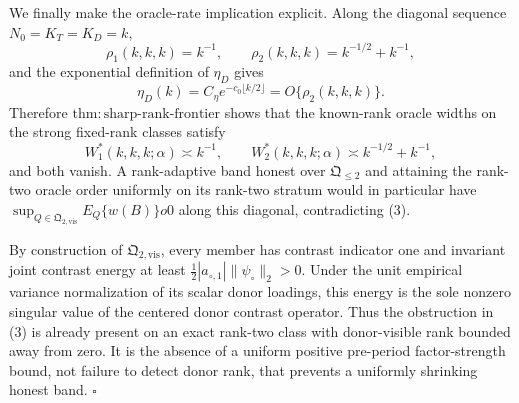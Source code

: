 We finally make the oracle-rate implication explicit.  Along the diagonal
sequence \(N_0=K_T=K_D=k\),
\[
 \rho_1(k,k,k)=k^{-1},
 \qquad
 \rho_2(k,k,k)=k^{-1/2}+k^{-1},                            \tag{7}
\]
and the exponential definition of \(\eta_D\) gives
\[
 \eta_D(k)=C_\eta e^{-c_0\lfloor k/2\rfloor}
 =O\{\rho_2(k,k,k)\}.                                     \tag{8}
\]
Therefore \(\mathrm{thm:sharp\mbox{-}rank\mbox{-}frontier}\) shows that
the known-rank oracle widths on the strong fixed-rank classes satisfy
\[
 W_1^*(k,k,k;\alpha)\asymp k^{-1},
 \qquad
 W_2^*(k,k,k;\alpha)\asymp k^{-1/2}+k^{-1},               \tag{9}
\]
and both vanish.  A rank-adaptive band honest over
\(\mathfrak Q_{\leq2}\) and attaining the rank-two oracle order uniformly
on its rank-two stratum would in particular have
\(\sup_{Q\in\mathfrak Q_{2,\mathrm{vis}}}E_Q\{w(B)\}  o0\)
along this diagonal, contradicting (3).

By construction of \(\mathfrak Q_{2,\mathrm{vis}}\), every member has
contrast indicator one and invariant joint contrast energy at least
\(\tfrac12|a_{\circ,1}|\|\psi_\circ\|_2>0\).  Under the unit empirical
variance normalization of its scalar donor loadings, this energy is the
sole nonzero singular value of the centered donor contrast operator.
Thus the obstruction in (3) is already present on an exact rank-two class
with donor-visible rank bounded away from zero.  It is the absence of a
uniform positive pre-period factor-strength bound, not failure to detect
donor rank, that prevents a uniformly shrinking honest band. \(\square\)